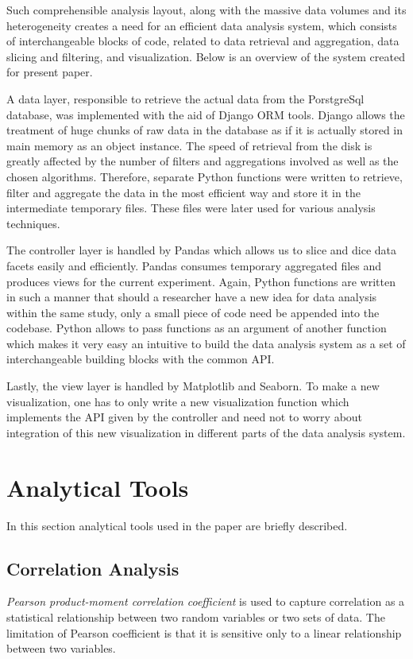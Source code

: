 	Such comprehensible analysis layout, along with the massive data volumes and its heterogeneity creates a need for an efficient data analysis system, which consists of interchangeable blocks of code, related to data retrieval and aggregation, data slicing and filtering, and visualization.  Below is an overview of the system created for present paper.
	
	A data layer, responsible to retrieve the actual data from the PorstgreSql database, was implemented with the aid of Django ORM tools. Django allows the treatment of huge chunks of raw data in the database as if it is actually stored in main memory as an object instance. The speed of retrieval from the disk is greatly affected by the number of filters and aggregations involved as well as the chosen algorithms. Therefore, separate Python functions were written to retrieve, filter and aggregate the data in the most efficient way and store it in the intermediate temporary files. These files were later used for various analysis techniques. 
	
	The controller layer is handled by Pandas which allows us to slice and dice data facets easily and efficiently. Pandas consumes temporary aggregated files and produces views for the current experiment. Again, Python functions are written in such a manner that should a researcher have a new idea for data analysis within the same study, only a small piece of code need be appended into the codebase. Python allows to pass functions as an argument of another function which makes it very easy an intuitive to build the data analysis system as a set of interchangeable building blocks with the common API. 
	
	Lastly, the view layer is handled by Matplotlib and Seaborn. To make a new visualization, one has to only write a new visualization function which implements the API given by the controller and need not to worry about integration of this new visualization in different parts of the data analysis system. 	
	
\section{Analytical Tools}
	In this section analytical tools used in the paper are briefly described.
	\subsection{Correlation Analysis}
	\textit{Pearson product-moment correlation coefficient} is used to capture correlation as a statistical relationship between two random variables or two sets of data. The limitation of Pearson coefficient is that it is sensitive only to a linear relationship between two variables.
	
